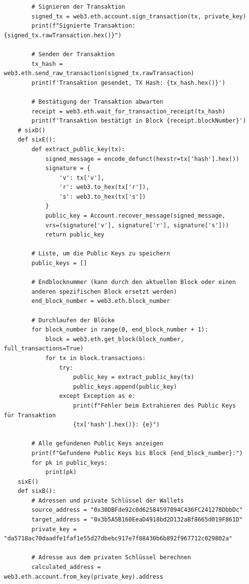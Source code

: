 \documentclass[german]{../uebung}
\begin{document}
\begin{exercise}{1}
\begin{verbatim}
        # Signieren der Transaktion
        signed_tx = web3.eth.account.sign_transaction(tx, private_key)
        print(f"Signierte Transaktion: {signed_tx.rawTransaction.hex()}")

        # Senden der Transaktion
        tx_hash = web3.eth.send_raw_transaction(signed_tx.rawTransaction)
        print(f'Transaktion gesendet, TX Hash: {tx_hash.hex()}')

        # Bestätigung der Transaktion abwarten
        receipt = web3.eth.wait_for_transaction_receipt(tx_hash)
        print(f'Transaktion bestätigt in Block {receipt.blockNumber}')
    # sixD()
    def sixE():
        def extract_public_key(tx):
            signed_message = encode_defunct(hexstr=tx['hash'].hex())
            signature = {
                'v': tx['v'],
                'r': web3.to_hex(tx['r']),
                's': web3.to_hex(tx['s'])
            }
            public_key = Account.recover_message(signed_message, 
            vrs=(signature['v'], signature['r'], signature['s']))
            return public_key

        # Liste, um die Public Keys zu speichern
        public_keys = []

        # Endblocknummer (kann durch den aktuellen Block oder einen 
        anderen spezifischen Block ersetzt werden)
        end_block_number = web3.eth.block_number

        # Durchlaufen der Blöcke
        for block_number in range(0, end_block_number + 1):
            block = web3.eth.get_block(block_number, full_transactions=True)
            for tx in block.transactions:
                try:
                    public_key = extract_public_key(tx)
                    public_keys.append(public_key)
                except Exception as e:
                    print(f"Fehler beim Extrahieren des Public Keys für Transaktion 
                    {tx['hash'].hex()}: {e}")

        # Alle gefundenen Public Keys anzeigen
        print(f"Gefundene Public Keys bis Block {end_block_number}:")
        for pk in public_keys:
            print(pk)
    sixE()
    def sixB():
        # Adressen und private Schlüssel der Wallets
        source_address = "0x30DBFde92c0d62584597094C436FC241278DbbDc"
        target_address = "0x3b5A5B160EeaD4918bd2D132aBf8665d019F861D"
        private_key = "da5718ac70daadfe1faf1e55d27dbebc917e7f88430b6b892f967712c029802a"

        # Adresse aus dem privaten Schlüssel berechnen
        calculated_address = web3.eth.account.from_key(private_key).address


\end{verbatim}
\end{exercise}
\end{document}
